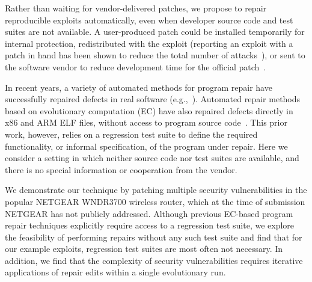 \documentclass{sigcomm-alternate}
\begin{document}

Rather than waiting for vendor-delivered patches, we propose 
to repair reproducible exploits automatically,
even when developer
source code and test suites are not available.
A user-produced patch could be installed temporarily for internal
protection, redistributed with the exploit (reporting an exploit with
a patch in hand has been shown to reduce the total number of
attacks~\cite{arora2006does}), or sent to the software vendor to
reduce development time for the official patch~\cite{weimer06}.

In recent years, a variety of automated methods for program repair
have successfully repaired defects in real software
(e.g.,~\cite{clearview,genprog-tse-journal,par,nguyen2013semfix}).
Automated repair methods based on evolutionary computation (EC) have also
repaired defects directly in x86 and ARM ELF files, without access to
program source code~\cite{schulte2013embedded}.  This prior work,
however, relies on a regression test suite to define the required
functionality, or informal specification, of the program under repair.
Here we consider a setting in which neither source code nor test
suites are available, and there is no special information or
cooperation from the vendor.


We demonstrate our technique by
patching multiple security vulnerabilities in the popular NETGEAR
WNDR3700 wireless router, which at the time of submission NETGEAR has
not publicly addressed.
Although previous EC-based program repair techniques 
explicitly require access to a regression test suite, we explore the
feasibility of performing repairs without any such test suite and find
that for our example exploits, regression test suites are most often
not necessary. In addition, we find that the complexity of security
vulnerabilities requires iterative applications of repair edits
within a single evolutionary run.
\end{document}
